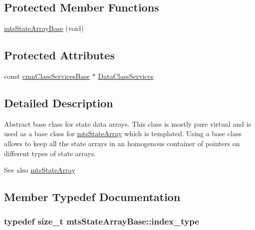 \subsection*{Protected Member Functions}
\begin{DoxyCompactItemize}
\item 
\hyperlink{classmts_state_array_base_aa00e3667f9cc11adf351d6d7cb09fea7}{mts\+State\+Array\+Base} (void)
\end{DoxyCompactItemize}
\subsection*{Protected Attributes}
\begin{DoxyCompactItemize}
\item 
const \hyperlink{classcmn_class_services_base}{cmn\+Class\+Services\+Base} $\ast$ \hyperlink{classmts_state_array_base_abd3be9ad51f2cb1930cddd78cc6f1216}{Data\+Class\+Services}
\end{DoxyCompactItemize}


\subsection{Detailed Description}
Abstract base class for state data arrays. This class is mostly pure virtual and is used as a base class for \hyperlink{classmts_state_array}{mts\+State\+Array} which is templated. Using a base class allows to keep all the state arrays in an homogenous container of pointers on different types of state arrays.

\begin{DoxySeeAlso}{See also}
\hyperlink{classmts_state_array}{mts\+State\+Array} 
\end{DoxySeeAlso}


\subsection{Member Typedef Documentation}
\hypertarget{classmts_state_array_base_a22ecbf65a907a7550951d12970f3df1d}{}
\subsubsection[{index\+\_\+type}]{\setlength{\rightskip}{0pt plus 5cm}typedef size\+\_\+t {\bf mts\+State\+Array\+Base\+::index\+\_\+type}}\label{classmts_state_array_base_a22ecbf65a907a7550951d12970f3df1d}
\hypertarget{classmts_state_array_base_a2a29f8b24a48620f67c907fc5592fc17}{}
